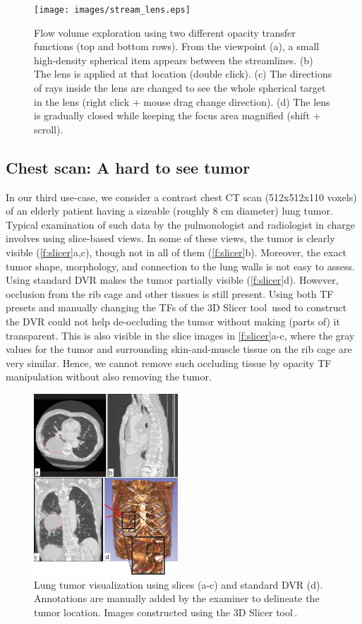 \begin{figure}[htb]
\texttt{[image: images/stream\_lens.eps]}
\caption{Flow volume exploration using two different opacity transfer functions (top and bottom rows). From the viewpoint (a), a small high-density spherical item appears between the streamlines. (b) The lens is applied at that location (double click). (c) The directions of rays inside the lens are changed to see the whole spherical target in the lens (right click + mouse drag change direction). (d) The lens is gradually closed while keeping the focus area magnified (shift + scroll).}
\label{f:stream_lens}
\end{figure}

\subsection{Chest scan: A hard to see tumor}
%
In our third use-case, we consider a contrast chest CT scan (512x512x110 voxels) of an elderly patient having a sizeable (roughly 8 cm diameter) lung tumor. Typical examination of such data by the pulmonologist and radiologist in charge involves using slice-based views. In some of these views, the tumor is clearly visible (\autoref{f:slicer}a,c), though not in all of them (\autoref{f:slicer}b). Moreover, the exact tumor shape, morphology, and connection to the lung walls is not easy to assess. Using standard DVR makes the tumor partially visible (\autoref{f:slicer}d). However, occlusion from the rib cage and other tissues is still present. Using both TF presets and manually changing the TFs of the 3D Slicer tool\,\cite{slicer} used to construct the DVR could not help de-occluding the tumor without making (parts of) it transparent. This is also visible in the slice images in \autoref{f:slicer}a-c, where the gray values for the tumor and surrounding skin-and-muscle tissue on the rib cage are very similar. Hence, we cannot remove such occluding tissue by opacity TF manipulation without also removing the tumor.

\begin{figure}[htb]
\includegraphics [width=0.48\textwidth]{images/slicer.eps}
\caption{Lung tumor visualization using slices (a-c) and standard DVR (d). Annotations are manually added by the examiner to delineate the tumor location. Images constructed using the 3D Slicer tool\,\cite{slicer}.}
\label{f:slicer}
\end{figure}

